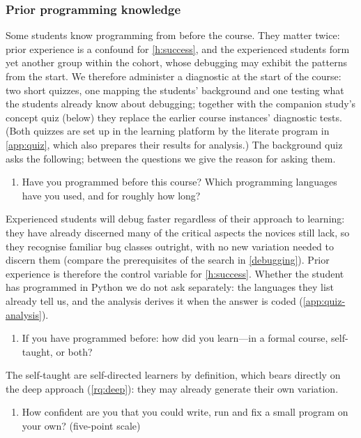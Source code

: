 \subsubsection{Prior programming knowledge}
\label{prior-knowledge}

Some students know programming from before the course.
They matter twice: prior experience is a confound for \cref{h:success}, and
the experienced students form yet another group within the cohort, whose
debugging may exhibit the patterns from the start.
We therefore administer a diagnostic at the start of the course: two
short quizzes, one mapping the students' background and one testing
what the students already know about debugging; together with the
companion study's concept quiz (below) they replace the earlier course
instances' diagnostic tests.
(Both quizzes are set up in the learning platform by the literate
program in \cref{app:quiz}, which also prepares their results for
analysis.)
The background quiz asks the following; between the questions we give
the reason for asking them.
\begin{enumerate}
  \item Have you programmed before this course?
    Which programming languages have you used, and for roughly how long?
\end{enumerate}
Experienced students will debug faster regardless of their approach to
learning: they have already discerned many of the critical aspects the
novices still lack, so they recognise familiar bug classes outright,
with no new variation needed to discern them (compare the prerequisites
of the search in \cref{debugging}).
Prior experience is therefore the control variable for \cref{h:success}.
Whether the student has programmed in Python we do not ask separately:
the languages they list already tell us, and the analysis derives it
when the answer is coded (\cref{app:quiz-analysis}).
\begin{enumerate}[resume]
  \item If you have programmed before: how did you learn---in a
    formal course, self-taught, or both?
\end{enumerate}
The self-taught are self-directed learners by definition, which bears
directly on the deep approach (\cref{rq:deep}): they may already generate
their own variation.
\begin{enumerate}[resume]
  \item How confident are you that you could write, run and fix a
    small program on your own?
    (five-point scale)
\end{enumerate}
